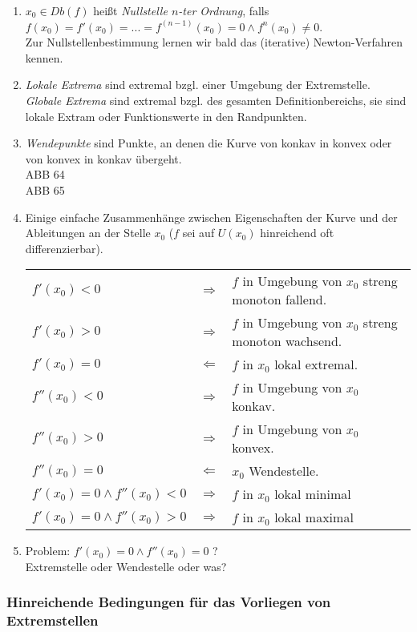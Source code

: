 \begin{enumerate}
\item $x_0 \in Db(f)$ heißt \emph{Nullstelle $n$-ter Ordnung}, falls \\
$f(x_0) = f'(x_0)=...=f^{(n-1)}(x_0)=0 \wedge f^n (x_0) \not = 0$.\\
Zur Nullstellenbestimmung lernen wir bald das (iterative) Newton-Verfahren kennen.
\item \emph{Lokale Extrema} sind extremal bzgl. einer Umgebung der Extremstelle.\\
\emph{Globale Extrema} sind extremal bzgl. des gesamten Definitionbereichs, sie sind lokale Extram oder Funktionswerte in den Randpunkten.
\item \emph{Wendepunkte} sind Punkte, an denen die Kurve von konkav in konvex oder von konvex in konkav übergeht.\\
ABB 64\\
ABB 65
\item Einige einfache Zusammenhänge zwischen Eigenschaften der Kurve und der Ableitungen an der Stelle $x_0$ ($f$ sei auf $U(x_0)$ hinreichend oft differenzierbar).\\
\begin{tabular}{l c l }
$f'(x_0)<0$ & $\Rightarrow$ & $f$ in Umgebung von $x_0$ streng monoton fallend.\\
$f'(x_0)>0$ & $\Rightarrow$ & $f$ in Umgebung von $x_0$ streng monoton wachsend.\\
$f'(x_0)=0$ & $\Leftarrow$ & $f$ in $x_0$ lokal extremal.\\
\hline
$f''(x_0)<0$ & $\Rightarrow$ & $f$ in Umgebung von $x_0$ konkav.\\
$f''(x_0)>0$ & $\Rightarrow$ & $f$ in Umgebung von $x_0$ konvex.\\
$f''(x_0)=0$ & $\Leftarrow$ & $x_0$ Wendestelle.\\
\hline 
$f'(x_0)=0 \wedge f''(x_0)<0$ & $\Rightarrow$ & $f$ in $x_0$ lokal minimal\\
$f'(x_0)=0 \wedge f''(x_0)>0$ & $\Rightarrow$ & $f$ in $x_0$ lokal maximal\\
\end{tabular}
\item Problem: $f'(x_0)=0 \wedge f''(x_0)=0$ ?\\
Extremstelle oder Wendestelle oder was?
\end{enumerate}
\subsubsection*{Hinreichende Bedingungen für das Vorliegen von Extremstellen}
